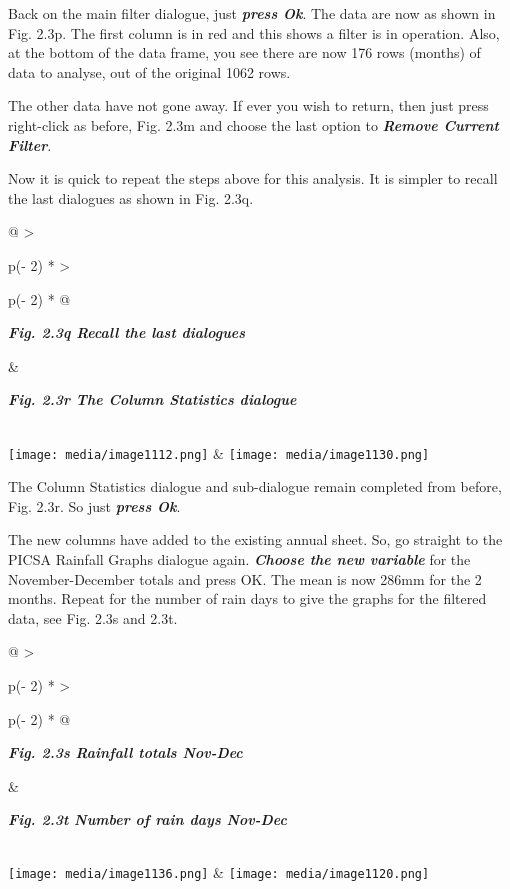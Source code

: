 \documentclass[
  letterpaper,
  DIV=11,
  numbers=noendperiod]{scrreprt}
\begin{document}
Back on the main filter dialogue, just \textbf{\emph{press Ok}}. The
data are now as shown in Fig. 2.3p. The first column is in red and this
shows a filter is in operation. Also, at the bottom of the data frame,
you see there are now 176 rows (months) of data to analyse, out of the
original 1062 rows.

The other data have not gone away. If ever you wish to return, then just
press right-click as before, Fig. 2.3m and choose the last option to
\textbf{\emph{Remove Current Filter}}.

Now it is quick to repeat the steps above for this analysis. It is
simpler to recall the last dialogues as shown in Fig. 2.3q.

\begin{longtable}[]{@{}
  >{\raggedright\arraybackslash}p{(\columnwidth - 2\tabcolsep) * }
  >{\raggedright\arraybackslash}p{(\columnwidth - 2\tabcolsep) * }@{}}
\toprule\noalign{}
\begin{minipage}[b]{\linewidth}\raggedright
\textbf{\emph{Fig. 2.3q Recall the last dialogues}}
\end{minipage} & \begin{minipage}[b]{\linewidth}\raggedright
\textbf{\emph{Fig. 2.3r The Column Statistics dialogue}}
\end{minipage} \\
\midrule\noalign{}
\endhead
\bottomrule\noalign{}
\endlastfoot
\texttt{[image: media/image1112.png]}
&
\texttt{[image: media/image1130.png]} \\
\end{longtable}

The Column Statistics dialogue and sub-dialogue remain completed from
before, Fig. 2.3r. So just \textbf{\emph{press Ok}}.

The new columns have added to the existing annual sheet. So, go straight
to the PICSA Rainfall Graphs dialogue again. \textbf{\emph{Choose the
new variable}} for the November-December totals and press OK. The mean
is now 286mm for the 2 months. Repeat for the number of rain days to
give the graphs for the filtered data, see Fig. 2.3s and 2.3t.

\begin{longtable}[]{@{}
  >{\raggedright\arraybackslash}p{(\columnwidth - 2\tabcolsep) * }
  >{\raggedright\arraybackslash}p{(\columnwidth - 2\tabcolsep) * }@{}}
\toprule\noalign{}
\begin{minipage}[b]{\linewidth}\raggedright
\textbf{\emph{Fig. 2.3s Rainfall totals Nov-Dec}}
\end{minipage} & \begin{minipage}[b]{\linewidth}\raggedright
\textbf{\emph{Fig. 2.3t Number of rain days Nov-Dec}}
\end{minipage} \\
\midrule\noalign{}
\endhead
\bottomrule\noalign{}
\endlastfoot
\texttt{[image: media/image1136.png]}
&
\texttt{[image: media/image1120.png]} \\
\end{longtable}
\end{document}
